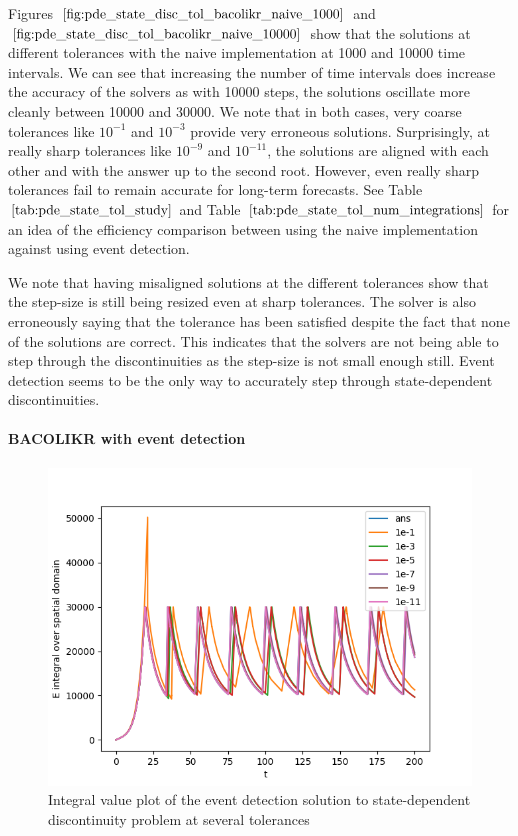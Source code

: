 \documentclass{article}
\begin{document}
Figures $\ref{fig:pde_state_disc_tol_bacolikr_naive_1000}$ and $\ref{fig:pde_state_disc_tol_bacolikr_naive_10000}$ show that the solutions at different tolerances with the naive implementation at 1000 and 10000 time intervals. We can see that increasing the number of time intervals does increase the accuracy of the solvers as with 10000 steps, the solutions oscillate more cleanly between 10000 and 30000. We note that in both cases, very coarse tolerances like $10^{-1}$ and $10^{-3}$ provide very erroneous solutions. Surprisingly, at really sharp tolerances like $10^{-9}$ and $10^{-11}$, the solutions are aligned with each other and with the answer up to the second root. However, even really sharp tolerances fail to remain accurate for long-term forecasts. See Table $\ref{tab:pde_state_tol_study}$ and Table $\ref{tab:pde_state_tol_num_integrations}$ for an idea of the efficiency comparison between using the naive implementation against using event detection. 

We note that having misaligned solutions at the different tolerances show that the step-size is still being resized even at sharp tolerances. The solver is also erroneously saying that the tolerance has been satisfied despite the fact that none of the solutions are correct. This indicates that the solvers are not being able to step through the discontinuities as the step-size is not small enough still. Event detection seems to be the only way to accurately step through state-dependent discontinuities.

\paragraph{BACOLIKR with event detection}
\begin{figure}[H]
\centering
\includegraphics[width=0.7\linewidth]{./figures/pde_state_disc_tol_event}
\caption{Integral value plot of the event detection solution to state-dependent discontinuity problem at several tolerances}
\label{fig:pde_state_disc_tol_event}
\end{figure}
\end{document}
